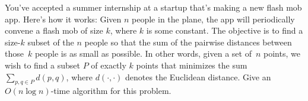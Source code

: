 \documentclass[11pt,addpoints]{exam}
\begin{document}
\begin{questions}
  You've accepted a summer internship at a startup that's making a new flash mob app.
  Here's how it works: Given $n$ people in the plane, the app will periodically convene a flash mob of size $k$, where $k$ is some constant.
  The objective is to find a size-$k$ subset of the $n$ people so that the sum of the pairwise distances between those~$k$ people is as small as possible.
  In other words, given a set of~$n$ points, we wish to find a subset $P$ of exactly $k$ points that minimizes the sum $\sum_{p, q \in P} d(p, q)$, where $d(\cdot, \cdot)$ denotes the Euclidean distance.
  Give an $O(n \log n)$-time algorithm for this problem.

  \begin{solution}

  \end{solution}
\end{questions}
\end{document}
